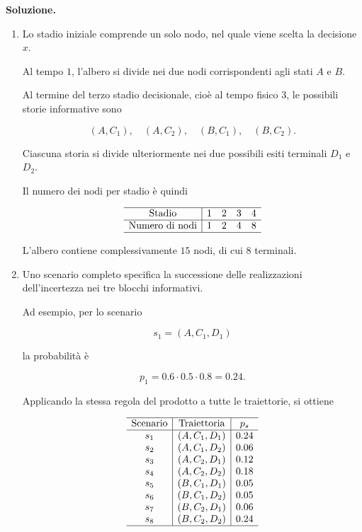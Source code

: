 \noindent
\textbf{Soluzione.}

\begin{enumerate}

\item Lo stadio iniziale comprende un solo nodo,
nel quale viene scelta la decisione $x$.

Al tempo $1$, l'albero si divide nei due nodi
corrispondenti agli stati $A$ e $B$.

Al termine del terzo stadio decisionale,
cio\`e al tempo fisico $3$,
le possibili storie informative sono

\[
(A,C_1),\quad
(A,C_2),\quad
(B,C_1),\quad
(B,C_2).
\]

Ciascuna storia si divide ulteriormente
nei due possibili esiti terminali
$D_1$ e $D_2$.

Il numero dei nodi per stadio \`e
quindi

\[
\begin{array}{c|cccc}
\hline
\text{Stadio} & 1&2&3&4\\
\hline
\text{Numero di nodi} &1&2&4&8\\
\hline
\end{array}
\]

L'albero contiene complessivamente
$15$ nodi, di cui $8$ terminali.

\item Uno scenario completo specifica
la successione delle realizzazioni
dell'incertezza nei tre blocchi informativi.

Ad esempio, per lo scenario

\[
s_1=(A,C_1,D_1)
\]

la probabilit\`a \`e

\[
p_1
=
0.6\cdot0.5\cdot0.8
=
0.24.
\]

Applicando la stessa regola del prodotto
a tutte le traiettorie, si ottiene

\[
\begin{array}{c|c|c}
\hline
\text{Scenario}
&
\text{Traiettoria}
&
p_s\\
\hline
s_1&(A,C_1,D_1)&0.24\\
s_2&(A,C_1,D_2)&0.06\\
s_3&(A,C_2,D_1)&0.12\\
s_4&(A,C_2,D_2)&0.18\\
s_5&(B,C_1,D_1)&0.05\\
s_6&(B,C_1,D_2)&0.05\\
s_7&(B,C_2,D_1)&0.06\\
s_8&(B,C_2,D_2)&0.24\\
\hline
\end{array}
\]


\end{enumerate}
